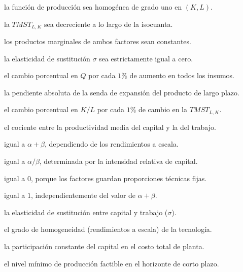 \begin{opts}
    \item la función de producción sea homogénea de grado uno en $(K,L)$.
    \item la $TMST_{L,K}$ sea decreciente a lo largo de la isocuanta.
    \item los productos marginales de ambos factores sean constantes.
    \item la elasticidad de sustitución $\sigma$ sea estrictamente igual a cero.
\end{opts}

\begin{opts}
    \item el cambio porcentual en $Q$ por cada $1\%$ de aumento en todos los insumos.
    \item la pendiente absoluta de la senda de expansión del producto de largo plazo.
    \item el cambio porcentual en $K/L$ por cada $1\%$ de cambio en la $TMST_{L,K}$.
    \item el cociente entre la productividad media del capital y la del trabajo.
\end{opts}

\begin{opts}
    \item igual a $\alpha + \beta$, dependiendo de los rendimientos a escala.
    \item igual a $\alpha/\beta$, determinada por la intensidad relativa de capital.
    \item igual a $0$, porque los factores guardan proporciones técnicas fijas.
    \item igual a $1$, independientemente del valor de $\alpha + \beta$.
\end{opts}

\begin{opts}
    \item la elasticidad de sustitución entre capital y trabajo ($\sigma$).
    \item el grado de homogeneidad (rendimientos a escala) de la tecnología.
    \item la participación constante del capital en el costo total de planta.
    \item el nivel mínimo de producción factible en el horizonte de corto plazo.
\end{opts}

